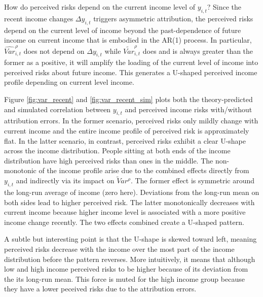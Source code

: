\documentclass[12pt,notitlepage,onecolumn,aps,pra]{article}
\begin{document}
How do perceived risks depend on the current income level of
\(y_{i,t}\)? Since the recent income changes \(\Delta y_{i,t}\) triggers
asymmetric attribution, the perceived risks depend on the current level
of income beyond the past-dependence of future income on current income
that is embodied in the AR(1) process. In particular,
\(\widehat{Var}^\rho_{i,t}\) does not depend on \(\Delta y_{i,t}\) while
\(\tilde{Var}^\rho_{i,t}\) does and is always greater than the former as
a positive, it will amplify the loading of the current level of income
into perceived risks about future income. This generates a U-shaped
perceived income profile depending on current level income.

Figure \ref{fig:var_recent} and \ref{fig:var_recent_sim} plots both the
theory-predicted and simulated correlation between \(y_{i,t}\) and
perceived income risks with/without attribution errors. In the former
scenario, perceived risks only mildly change with current income and the
entire income profile of perceived risk is approximately flat. In the
latter scenario, in contrast, perceived risks exhibit a clear U-shape
across the income distribution. People sitting at both ends of the
income distribution have high perceived risks than ones in the middle.
The non-monotonic of the income profile arise due to the combined
effects directly from \(y_{i,t}\) and indirectly via its impact on
\(\tilde Var^{\rho}\). The former effect is symmetric around the
long-run average of income (zero here). Deviations from the long-run
mean on both sides lead to higher perceived risk. The latter
monotonically decreases with current income because higher income level
is associated with a more positive income change recently. The two
effects combined create a U-shaped pattern.

A subtle but interesting point is that the U-shape is skewed toward
left, meaning perceived risks decrease with the income over the most
part of the income distribution before the pattern reverses. More
intuitively, it means that although low and high income perceived risks
to be higher because of its deviation from the its long-run mean. This
force is muted for the high income group because they have a lower
peceived risks due to the attribution errors.


    \begin{figure*}[!ht]
        \begin{center}\end{center}
        \caption{Simulated Income Profile of Perceived Risk}
        \label{fig:var_recent_sim}
    \end{figure*}
    
\end{document}
